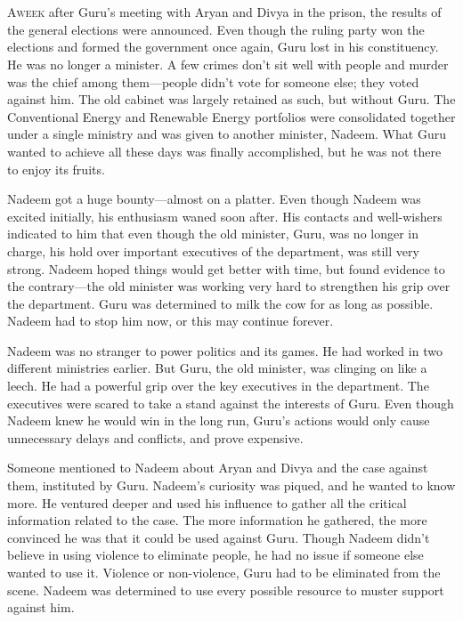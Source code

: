 \chapter{}

\lettrine{A}{week} after Guru's meeting with Aryan and Divya in the prison, the
results of the general elections were announced. Even though the ruling party
won the elections and formed the government once again, Guru lost in his
constituency. He was no longer a minister. A few crimes don't sit well with
people and murder was the chief among them—people didn't vote for someone else;
they voted against him. The old cabinet was largely retained as such, but
without Guru. The Conventional Energy and Renewable Energy portfolios were
consolidated together under a single ministry and was given to another minister,
Nadeem. What Guru wanted to achieve all these days was finally accomplished, but
he was not there to enjoy its fruits.

Nadeem got a huge bounty—almost on a platter. Even though Nadeem was excited
initially, his enthusiasm waned soon after. His contacts and well-wishers
indicated to him that even though the old minister, Guru, was no longer in
charge, his hold over important executives of the department, was still very
strong. Nadeem hoped things would get better with time, but found evidence to
the contrary—the old minister was working very hard to strengthen his grip over
the department. Guru was determined to milk the cow for as long as possible.
Nadeem had to stop him now, or this may continue forever.

Nadeem was no stranger to power politics and its games. He had worked in two
different ministries earlier. But Guru, the old minister, was clinging on like a
leech. He had a powerful grip over the key executives in the department. The
executives were scared to take a stand against the interests of Guru. Even
though Nadeem knew he would win in the long run, Guru's actions would only cause
unnecessary delays and conflicts, and prove expensive.

Someone mentioned to Nadeem about Aryan and Divya and the case against them,
instituted by Guru. Nadeem's curiosity was piqued, and he wanted to know more.
He ventured deeper and used his influence to gather all the critical information
related to the case. The more information he gathered, the more convinced he was
that it could be used against Guru. Though Nadeem didn't believe in using
violence to eliminate people, he had no issue if someone else wanted to use it.
Violence or non-violence, Guru had to be eliminated from the scene.  Nadeem was
determined to use every possible resource to muster support against him.

